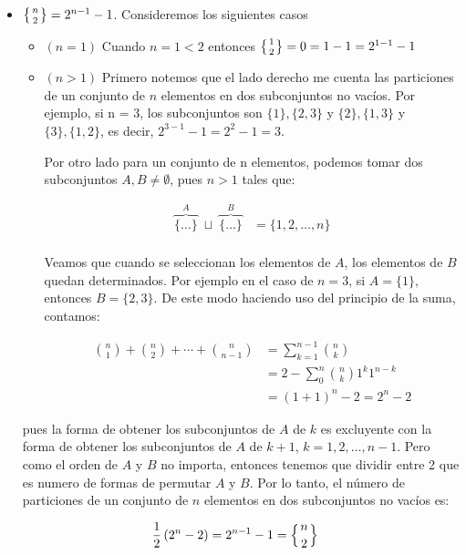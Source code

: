 \begin{solucion}
    \begin{itemize}
        \item $\left\{n \atop 2\right\} = 2^{n-1} - 1$.
        Consideremos los siguientes casos
        \begin{itemize}
            \item $(n = 1)$ Cuando $n=1 <2$ entonces $\left\{1 \atop 2\right\} = 0 = 1-1 = 2^{1-1} -1$
            \item $(n>1)$  Primero notemos que el lado derecho me cuenta las particiones de un conjunto de $n$ elementos en dos subconjuntos no vacíos. Por ejemplo, si n = 3, los subconjuntos son $\{1\}, \{2,3\}$ y $\{2\}, \{1,3\}$ y $\{3\}, \{1,2\}$, es decir, $2^{3-1} - 1 = 2^2 - 1 = 3$. 

            Por otro lado para un conjunto de n elementos, podemos tomar dos subconjuntos $A,B \neq \emptyset$, pues $n>1$ tales que:
    
            \begin{align*}
                \overbrace{\{\dots\}}^{A} \;\sqcup\; \overbrace{\{\dots\}}^{B} &= \{1,2,\dots,n\} \\
            \end{align*}
    
            Veamos que cuando se seleccionan los elementos de $A$, los elementos de $B$ quedan determinados. Por ejemplo en el caso de $n=3$, si $A = \{1\}$, entonces $B = \{2,3\}$. De este modo haciendo uso del principio de la suma, contamos:
    
            \begin{align*}
                \binom{n}{1} + \binom{n}{2} + \cdots + \binom{n}{n-1} &= \sum_{k=1}^{n-1} \binom{n}{k}\\
                &= 2- \sum_{0}^{n} \binom{n}{k} 1^k 1^{n-k} \\
                &= (1+1)^n - 2 = 2^n - 2
            \end{align*}
        \end{itemize}
      

        pues la forma de obtener los subconjuntos de $A$ de $k$ es excluyente con la forma de obtener los subconjuntos de $A$ de $k+1$, $k = 1,2,\dots,n-1$. Pero como el orden de $A$ y $B$ no importa, entonces tenemos que dividir entre 2 que es numero de formas de permutar $A$ y $B$. Por lo tanto, el número de particiones de un conjunto de $n$ elementos en dos subconjuntos no vacíos es:

        \begin{align*}
            \frac{1}{2} \left(2^n - 2\right) &= 2^{n-1} - 1 = \left\{n \atop 2\right\}
        \end{align*}


\end{itemize}
\end{solucion}
